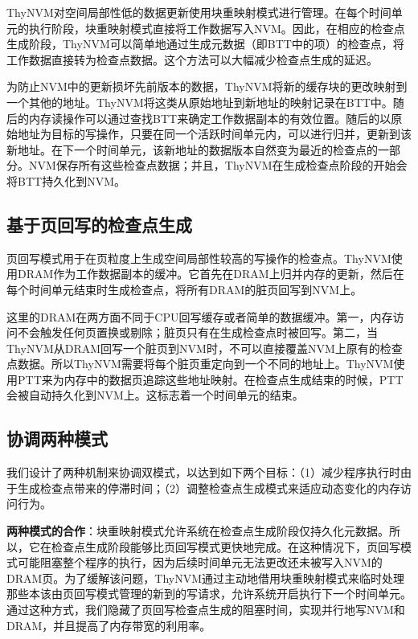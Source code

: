ThyNVM对空间局部性低的数据更新使用块重映射模式进行管理。在每个时间单元的执行阶段，块重映射模式直接将工作数据写入NVM。因此，在相应的检查点生成阶段，ThyNVM可以简单地通过生成元数据（即BTT中的项）的检查点，将工作数据直接转为检查点数据。这个方法可以大幅减少检查点生成的延迟。

为防止NVM中的更新损坏先前版本的数据，ThyNVM将新的缓存块的更改映射到一个其他的地址。ThyNVM将这类从原始地址到新地址的映射记录在BTT中。随后的内存读操作可以通过查找BTT来确定工作数据副本的有效位置。随后的以原始地址为目标的写操作，只要在同一个活跃时间单元内，可以进行归并，更新到该新地址。在下一个时间单元，该新地址的数据版本自然变为最近的检查点的一部分。NVM保存所有这些检查点数据；并且，ThyNVM在生成检查点阶段的开始会将BTT持久化到NVM。

\subsection{基于页回写的检查点生成}
\label{subsec:page-writeback}

页回写模式用于在页粒度上生成空间局部性较高的写操作的检查点。ThyNVM使用DRAM作为工作数据副本的缓冲。它首先在DRAM上归并内存的更新，然后在每个时间单元结束时生成检查点，将所有DRAM的脏页回写到NVM上。

这里的DRAM在两方面不同于CPU回写缓存或者简单的数据缓冲。第一，内存访问不会触发任何页置换或剔除；脏页只有在生成检查点时被回写。第二，当ThyNVM从DRAM回写一个脏页到NVM时，不可以直接覆盖NVM上原有的检查点数据。所以ThyNVM需要将每个脏页重定向到一个不同的地址上。ThyNVM使用PTT来为内存中的数据页追踪这些地址映射。在检查点生成结束的时候，PTT会被自动持久化到NVM上。这标志着一个时间单元的结束。

\subsection{协调两种模式}
\label{subsec:coordination}

我们设计了两种机制来协调双模式，以达到如下两个目标：（1）减少程序执行时由于生成检查点带来的停滞时间；（2）调整检查点生成模式来适应动态变化的内存访问行为。

\textbf{两种模式的合作}：块重映射模式允许系统在检查点生成阶段仅持久化元数据。所以，它在检查点生成阶段能够比页回写模式更快地完成。在这种情况下，页回写模式可能阻塞整个程序的执行，因为后续时间单元无法更改还未被写入NVM的DRAM页。为了缓解该问题，ThyNVM通过主动地借用块重映射模式来临时处理那些本该由页回写模式管理的新到的写请求，允许系统开启执行下一个时间单元。通过这种方式，我们隐藏了页回写检查点生成的阻塞时间，实现并行地写NVM和DRAM，并且提高了内存带宽的利用率。

